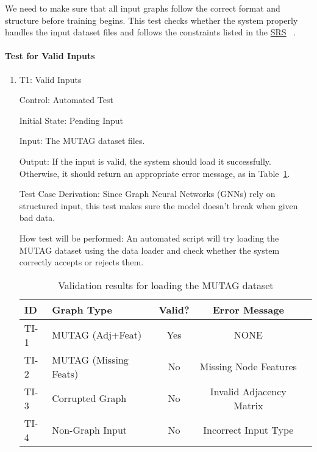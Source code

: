 \documentclass[12pt, titlepage]{article}
\begin{document}
We need to make sure that all input graphs follow the correct format and structure before training begins. This test checks whether the system properly handles the input dataset files and follows the constraints listed in the \href{https://github.com/Yuanqi-X/Re-ProtGNN/blob/main/docs/SRS/SRS.pdf}{SRS} ~\cite{Yuanqi_ReProtGNN_SRS}.
		
\paragraph{Test for Valid Inputs}

\begin{enumerate}


\item{T1: Valid Inputs\\}

Control: Automated Test
					
Initial State: Pending Input
					
Input: The MUTAG dataset files.
					
Output:  If the input is valid, the system should load it successfully. Otherwise, it should return an appropriate error message, as in Table~\ref{tab:graph_validation}.
					
Test Case Derivation: Since Graph Neural Networks (GNNs) rely on structured input, this test makes sure the model doesn't break when given bad data.
					
How test will be performed: An automated script will try loading the MUTAG dataset using the data loader and check whether the system correctly accepts or rejects them.

\begin{table}[h]
    \centering
    \setlength{\tabcolsep}{10pt} %
    \begin{tabularx}{\linewidth}{l X c c X} 
        \toprule
        \textbf{ID} & \textbf{Graph Type} & \textbf{Valid?} & \textbf{Error Message} \\
        \midrule
        TI-1 & MUTAG (Adj+Feat) & Yes & NONE \\
        TI-2 & MUTAG (Missing Feats) & No & Missing Node Features \\
        TI-3 & Corrupted Graph & No & Invalid Adjacency Matrix \\
        TI-4 & Non-Graph Input & No & Incorrect Input Type \\
        \bottomrule
    \end{tabularx}
    \caption{Validation results for loading the MUTAG dataset}
    \label{tab:graph_validation}
\end{table}

\end{enumerate}
\end{document}
